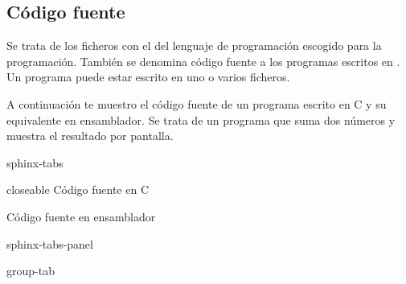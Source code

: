 \documentclass[letterpaper,10pt,spanish]{sphinxmanual}
\begin{document}
\subsection{Código fuente}
\label{\detokenize{obtencion_del_codigo:codigo-fuente}}
\sphinxAtStartPar
Se trata de los ficheros con el  del lenguaje de programación escogido para la programación. También se denomina código fuente a los programas escritos en . Un programa puede estar escrito en uno o varios ficheros.

\sphinxAtStartPar
A continuación te muestro el código fuente de un programa escrito en C y su equivalente en ensamblador. Se trata de un programa que suma dos números y muestra el resultado por pantalla.

\begin{sphinxuseclass}{sphinx-tabs}
\begin{sphinxuseclass}{closeable}
\sphinxAtStartPar
Código fuente en C

\sphinxAtStartPar
Código fuente en ensamblador

\end{sphinxuseclass}
\begin{sphinxuseclass}{sphinx-tabs-panel}
\begin{sphinxuseclass}{group-tab}
\def\sphinxLiteralBlockLabel{\label{\detokenize{obtencion_del_codigo:id1}}}
\begin{sphinxVerbatim}[commandchars=\\\{\}]
 

    
       

      
      

        

       


\end{sphinxVerbatim}
\end{sphinxuseclass}
\end{sphinxuseclass}
\end{sphinxuseclass}
\end{document}
